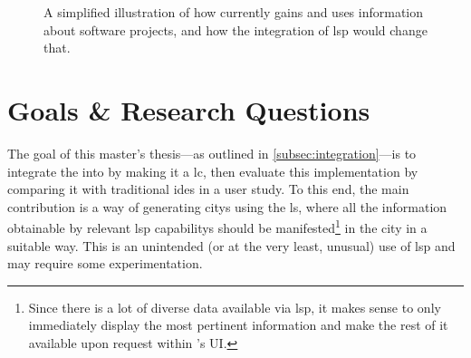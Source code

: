 \documentclass[../thesis]{subfiles}
\begin{document}
\begin{figure}
	\begin{center}
	\end{center}
	\caption{A simplified illustration of how \SEE{} currently gains and uses information about software projects, and how the integration of \gls{lsp} would change that.}\label{fig:seeplan}
\end{figure}

\section{Goals \& Research Questions}\label{sec:goals}
The goal of this master's thesis---as outlined in \cref{subsec:integration}---is to integrate the  into \SEE{} by making it a \gls{lc}, then evaluate this implementation by comparing it with traditional \glspl{ide} in a user study.
To this end, the main contribution is a way of generating \glspl{city} using the \gls{ls}, where all the information obtainable by relevant \gls{lsp} \glspl{capability} should be manifested\footnote{
	Since there is a lot of diverse data available via \gls{lsp}, it makes sense to only immediately display the most pertinent information and make the rest of it available upon request within \SEE{}'s UI.
} in the city in a suitable way.
This is an unintended (or at the very least, unusual) use of \gls{lsp} and may require some experimentation.
\end{document}
